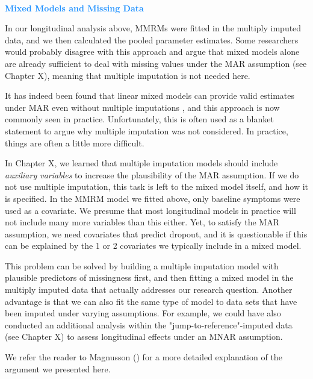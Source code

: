 \begin{box-info} \\
\textcolor{dodgerblue}{\textbf{Mixed Models and Missing Data}} 

\vspace{2mm}

In our longitudinal analysis above, MMRMs were fitted in the multiply imputed data, and we then calculated the pooled parameter estimates. Some researchers would probably disagree with this approach and argue that mixed models alone are already sufficient to deal with missing values under the MAR assumption (see Chapter X), meaning that multiple imputation is not needed here.

\vspace{2mm}

\hspace*{5mm} It has indeed been found that linear mixed models can provide valid estimates under MAR even without multiple imputations \citep{twisk2013multiple}, and this approach is now commonly seen in practice. Unfortunately, this is often used as a blanket statement to argue why multiple imputation was not considered. In practice, things are often a little more difficult. 

\vspace{2mm}

\hspace*{5mm} In Chapter X, we learned that multiple imputation models should include \emph{auxiliary variables} to increase the plausibility of the MAR assumption. If we do not use multiple imputation, this task is left to the mixed model itself, and how it is specified. In the MMRM model we fitted above, only baseline symptoms were used as a covariate. We presume that most longitudinal models in practice will not include many more variables than this either. Yet, to satisfy the MAR assumption, we need covariates that predict dropout, and it is questionable if this can be explained by the 1 or 2 covariates we typically include in a mixed model. 

\vspace{2mm}

\hspace*{5mm} This problem can be solved by building a multiple imputation model with plausible predictors of missingness first, and then fitting a mixed model in the multiply imputed data that actually addresses our research question. Another advantage is that we can also fit the same type of model to data sets that have been imputed under varying assumptions. For example, we could have also conducted an additional analysis within the "jump-to-reference"-imputed data (see Chapter X) to assess longitudinal effects under an MNAR assumption. 

\vspace{2mm}

\hspace*{5mm}We refer the reader to Magnusson (\citeyear{magnusson2019}) for a more detailed explanation of the argument we presented here. 

\end{box-info}


